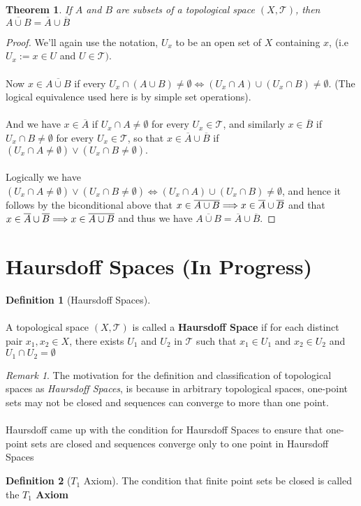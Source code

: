 \documentclass{article}
\newtheorem{theorem}{Theorem}[section]
\theoremstyle{remark}
\newtheorem*{remark}{Remark}
\theoremstyle{definition}
\newtheorem{definition}{Definition}[section]
\newcommand{\simplies}{\DOTSB\Longrightarrow}
\begin{document}
\medskip

\begin{theorem}
If $A$ and $B$ are subsets of a topological space $(X, \mathcal{T})$, then $\overline{A \cup B} = \overline{A} \cup \overline{B}$
\end{theorem}

\begin{proof}
We'll again use the notation, $U_x$ to be an open set of $X$ containing $x$, (i.e $U_x := x \in U$ and $U \in \mathcal{T})$. \\ \\Now $x \in \overline{A \cup B}$ if every $U_x \cap (A \cup B) \neq \emptyset \iff (U_x \cap A) \cup (U_x \cap B) \neq \emptyset$. (The logical equivalence used here is by simple set operations).
\\ \\
And we have $x \in \overline{A}$ if $U_x \cap A \neq \emptyset$ for every $U_x \in \mathcal{T}$, and similarly  $x \in \overline{B}$ if $U_x \cap B \neq \emptyset$ for every $U_x \in \mathcal{T}$, so that $x \in \overline{A} \cup \overline{B}$ if $(U_x \cap A \neq \emptyset) \lor (U_x \cap B \neq \emptyset).$
\\ \\
Logically we have $(U_x \cap A \neq \emptyset) \lor (U_x \cap B \neq \emptyset) \iff (U_x \cap A) \cup (U_x \cap B) \neq \emptyset$, and hence it follows by the biconditional  above that $x \in \overline{A \cup B} \simplies  x \in \overline{A} \cup \overline{B}$ and that $x \in \overline{A} \cup \overline{B} \simplies x \in \overline{A \cup B}$ and thus we have $\overline{A \cup B} = \overline{A} \cup \overline{B}$.
\end{proof}

\newpage

\section{Haursdoff Spaces (In Progress)}
\bigskip
\begin{definition}[Haursdoff Spaces]
\\ \\
A topological space $(X, \mathcal{T})$ is called a \textbf{Haursdoff Space} if for each distinct pair $x_1, x_2 \in X$, there exists $U_1$ and $U_2$ in $\mathcal{T}$ such that $x_1 \in U_1$ and $x_2 \in U_2$ and $U_1 \cap U_2 = \emptyset$
\end{definition}
\medskip
\begin{remark}
The motivation for the definition and classification of topological spaces as \textit{Haursdoff Spaces}, is because in arbitrary topological spaces, one-point sets may not be closed and sequences can converge to more than one point. 
\\ \\
Haursdoff came up with the condition for Haursdoff Spaces to ensure that one-point sets are closed and sequences converge only to one point in Haursdoff Spaces
\end{remark}

\begin{definition}[$T_1$ Axiom]
The condition that finite point sets be closed is called the \textbf{$T_1$ Axiom}

\end{definition}
\end{document}
